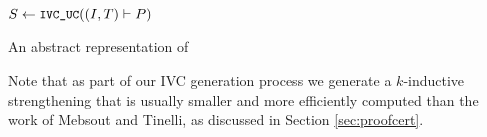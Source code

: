 \begin{algorithm}
  \BlankLine
  $S \leftarrow \texttt{\small{IVC\_UC}}((I, T) \vdash P)$ \\
   {
  }
\caption{An abstract representation of \ucbfalg }
\label{alg:ucbf}
\end{algorithm}

Note that as part of our IVC generation process we generate a $k$-inductive strengthening that is usually smaller and more efficiently computed than the work of Mebsout and Tinelli, as discussed in Section \ref{sec:proofcert}.

